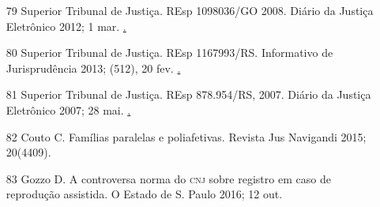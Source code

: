\documentclass{article}
\begin{document}
\begin{itemize}
\item[79] Superior Tribunal de Justiça. REsp 1098036/GO 2008. Diário da
Justiça Eletrônico 2012; 1 mar. \href{https://ww2.stj.jus.br/processo/revista/do
cumento/mediado/?componente=\textsc{ita}\&sequencial=1083493\&num\_{}registro=20080239670
2\&data=20120301\&formato=\textsc{pdf}}.

\item[80] Superior Tribunal de Justiça. REsp 1167993/RS. Informativo de
Jurisprudência 2013; (512), 20 fev. \href{http://www.stj.jus.br/\textsc{scon}/Search\textsc{brs}?b
=\textsc{infj}\&tipo=informativo\&livre=@\textsc{cod}=\%270512\%27}.

\item[81] Superior Tribunal de Justiça. REsp 878.954/RS, 2007. Diário da
Justiça Eletrônico 2007; 28 mai. \href{https://ww2.stj.jus.br/processo/revista/d
ocumento/mediado/?componente=\textsc{ita}\&sequencial=689273\&num\_{}registro=20060182349
0\&data=20070528\&formato=\textsc{pdf}}.

\item[82] Couto C. Famílias paralelas e poliafetivas. Revista Jus Navigandi
2015; 20(4409).

\item[83] Gozzo D. A controversa norma do \textsc{cnj} sobre registro em caso de
reprodução assistida. O Estado de S. Paulo 2016; 12 out.

\end{itemize}
\end{document}
